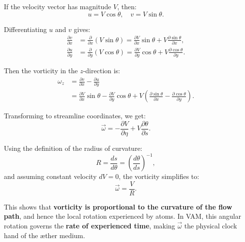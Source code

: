 \documentclass[12pt]{article}
\begin{document}
    If the velocity vector has magnitude \(V\), then:
    \begin{equation}
        u = V \cos \theta, \quad
        v = V \sin \theta.
    \end{equation}

    Differentiating \(u\) and \(v\) gives:
    \begin{align}
        \frac{\partial v}{\partial x} &= \frac{\partial}{\partial x} (V \sin \theta) = \frac{\partial V}{\partial x} \sin \theta + V \frac{\partial \sin \theta}{\partial x}, \\
        \frac{\partial u}{\partial y} &= \frac{\partial}{\partial y} (V \cos \theta) = \frac{\partial V}{\partial y} \cos \theta + V \frac{\partial \cos \theta}{\partial y}.
    \end{align}

    Then the vorticity in the \(z\)-direction is:
    \begin{align}
        \omega_z &= \frac{\partial v}{\partial x} - \frac{\partial u}{\partial y} \\
        &= \frac{\partial V}{\partial x} \sin \theta - \frac{\partial V}{\partial y} \cos \theta
        + V \left( \frac{\partial \sin \theta}{\partial x} - \frac{\partial \cos \theta}{\partial y} \right).
    \end{align}

    Transforming to streamline coordinates, we get:
    \begin{equation}
        \vec{\omega} = -\frac{\partial V}{\partial \eta} + V \frac{\partial \theta}{\partial s}.
    \end{equation}

    Using the definition of the radius of curvature:
    \begin{equation}
        R = \frac{ds}{d\theta} = \left( \frac{d\theta}{ds} \right)^{-1},
    \end{equation}
    and assuming constant velocity \(dV = 0\), the vorticity simplifies to:
    \begin{equation}
        \boxed{\vec{\omega} = \frac{V}{R}}.
    \end{equation}

    This shows that \textbf{vorticity is proportional to the curvature of the flow path}, and hence the local rotation experienced by atoms. In VAM, this angular rotation governs the \textbf{rate of experienced time}, making \(\vec{\omega}\) the physical clock hand of the æther medium.


\ifdefined\standalonechapter
\else


\end{document}
